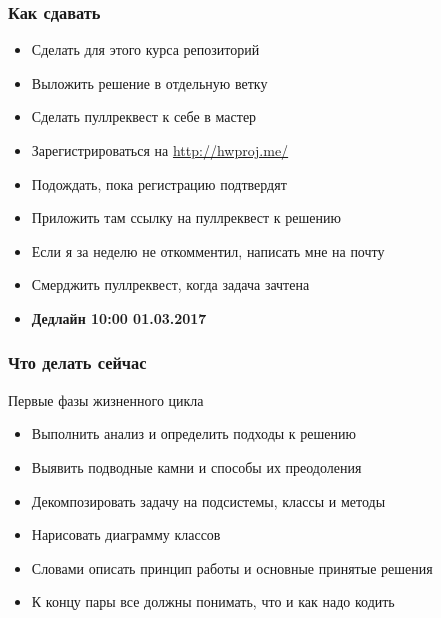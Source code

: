 \documentclass[xetex,mathserif,serif]{beamer}
\begin{document}
	\begin{frame}
		\frametitle{Как сдавать}
		\begin{itemize}
			\item Сделать для этого курса репозиторий
			\item Выложить решение в отдельную ветку
			\item Сделать пуллреквест к себе в мастер
			\item Зарегистрироваться на \url{http://hwproj.me/}
			\item Подождать, пока регистрацию подтвердят
			\item Приложить там ссылку на пуллреквест к решению
			\item Если я за неделю не откомментил, написать мне на почту
			\item Смерджить пуллреквест, когда задача зачтена
			\item \textbf{Дедлайн 10:00 01.03.2017}
		\end{itemize}
	\end{frame}
	
	\begin{frame}
		\frametitle{Что делать сейчас}
		Первые фазы жизненного цикла
		\begin{itemize}
			\item Выполнить анализ и определить подходы к решению
			\item Выявить подводные камни и способы их преодоления
			\item Декомпозировать задачу на подсистемы, классы и методы
			\item Нарисовать диаграмму классов
			\item Словами описать принцип работы и основные принятые решения
			\item К концу пары все должны понимать, что и как надо кодить
		\end{itemize}
	\end{frame}
\end{document}

